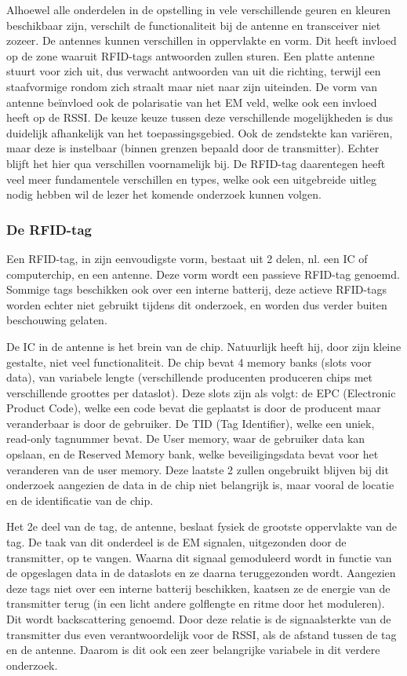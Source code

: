 Alhoewel alle onderdelen in de opstelling in vele verschillende geuren en kleuren beschikbaar zijn, verschilt de functionaliteit bij de antenne en transceiver niet zozeer. De antennes kunnen verschillen in oppervlakte en vorm. Dit heeft invloed op de zone waaruit RFID-tags antwoorden zullen sturen. Een platte antenne stuurt voor zich uit, dus verwacht antwoorden van uit die richting, terwijl een staafvormige rondom zich straalt maar niet naar zijn uiteinden. De vorm van antenne beïnvloed ook de polarisatie van het EM veld, welke ook een invloed heeft op de RSSI. De keuze keuze tussen deze verschillende mogelijkheden is dus duidelijk afhankelijk van het toepassingsgebied. Ook de zendstekte kan variëren, maar deze is instelbaar (binnen grenzen bepaald door de transmitter). Echter blijft het hier qua verschillen voornamelijk bij. De RFID-tag daarentegen heeft veel meer fundamentele verschillen en types, welke ook een uitgebreide uitleg nodig hebben wil de lezer het komende onderzoek kunnen volgen.

\subsubsection{De RFID-tag}
\label{sec:De RFID-tag}
Een RFID-tag, in zijn eenvoudigste vorm, bestaat uit 2 delen, nl. een IC of computerchip, en een antenne. Deze vorm wordt een passieve RFID-tag genoemd. Sommige tags beschikken ook over een interne batterij, deze actieve RFID-tags worden echter niet gebruikt tijdens dit onderzoek, en worden dus verder buiten beschouwing gelaten.\autocite{atlasrfidstore2022} 

De IC in de antenne is het brein van de chip. Natuurlijk heeft hij, door zijn kleine gestalte, niet veel functionaliteit. De chip bevat 4 memory banks (slots voor data), van variabele lengte (verschillende producenten produceren chips met verschillende groottes per dataslot). Deze slots zijn als volgt: de EPC (Electronic Product Code), welke een code bevat die geplaatst is door de producent maar veranderbaar is door de gebruiker. De TID (Tag Identifier), welke een uniek, read-only tagnummer bevat. De User memory, waar de gebruiker data kan opslaan, en de Reserved Memory bank, welke beveiligingsdata bevat voor het veranderen van de user memory.\autocite{Smiley2017} Deze laatste 2 zullen ongebruikt blijven bij dit onderzoek aangezien de data in de chip niet belangrijk is, maar vooral de locatie en de identificatie van de chip.

Het 2e deel van de tag, de antenne, beslaat fysiek de grootste oppervlakte van de tag. De taak van dit onderdeel is de EM signalen, uitgezonden door de transmitter, op te vangen. Waarna dit signaal gemoduleerd wordt in functie van de opgeslagen data in de dataslots en ze daarna teruggezonden wordt. Aangezien deze tags niet over een interne batterij beschikken, kaatsen ze de energie van de transmitter terug (in een licht andere golflengte en ritme door het moduleren). Dit wordt backscattering genoemd. Door deze relatie is de signaalsterkte van de transmitter dus even verantwoordelijk voor de RSSI, als de afstand tussen de tag en de antenne. Daarom is dit ook een zeer belangrijke variabele in dit verdere onderzoek.\autocite{atlasrfidstore2022a}

